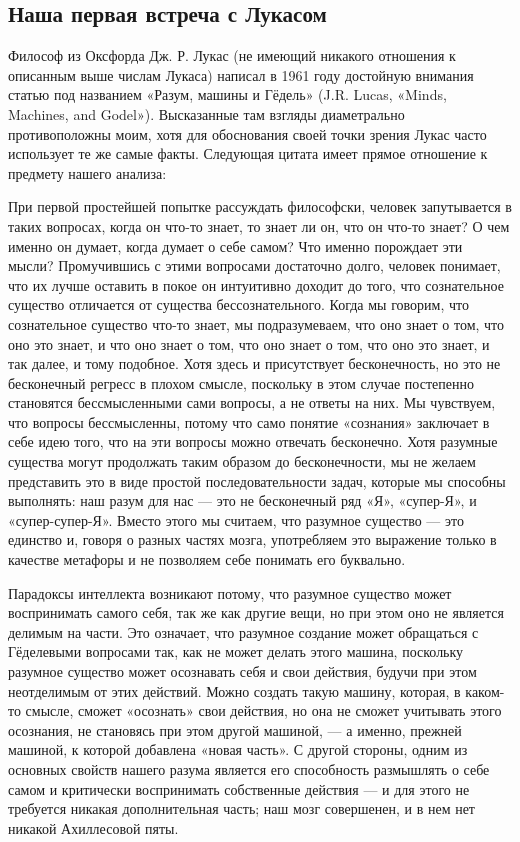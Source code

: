\documentclass[../main.tex]{subfiles}
\begin{document}
\subsection{Наша первая встреча с Лукасом}

Философ из Оксфорда Дж. Р. Лукас (не имеющий никакого отношения к описанным выше числам Лукаса) написал в 1961 году достойную внимания статью под названием «Разум, машины и Гёдель» (J.R. Lucas, «Minds, Machines, and Godel»). Высказанные там взгляды диаметрально противоположны моим, хотя для обоснования своей точки зрения Лукас часто использует те же самые факты. Следующая цитата имеет прямое отношение к предмету нашего анализа:

При первой простейшей попытке рассуждать философски, человек запутывается в таких вопросах, когда он что-то знает, то знает ли он, что он что-то знает? О чем именно он думает, когда думает о себе самом? Что именно порождает эти мысли? Промучившись с этими вопросами достаточно долго, человек понимает, что их лучше оставить в покое он интуитивно доходит до того, что сознательное существо отличается от существа бессознательного. Когда мы говорим, что сознательное существо что-то знает, мы подразумеваем, что оно знает о том, что оно это знает, и что оно знает о том, что оно знает о том, что оно это знает, и так далее, и тому подобное. Хотя здесь и присутствует бесконечность, но это не бесконечный регресс в плохом смысле, поскольку в этом случае постепенно становятся бессмысленными сами вопросы, а не ответы на них. Мы чувствуем, что вопросы бессмысленны, потому что само понятие «сознания» заключает в себе идею того, что на эти вопросы можно отвечать бесконечно. Хотя разумные существа могут продолжать таким образом до бесконечности, мы не желаем представить это в виде простой последовательности задач, которые мы способны выполнять: наш разум для нас --- это не бесконечный ряд «Я», «супер-Я», и «супер-супер-Я». Вместо этого мы считаем, что разумное существо --- это единство и, говоря о разных частях мозга, употребляем это выражение только в качестве метафоры и не позволяем себе понимать его буквально.

Парадоксы интеллекта возникают потому, что разумное существо может воспринимать самого себя, так же как другие вещи, но при этом оно не является делимым на части. Это означает, что разумное создание может обращаться с Гёделевыми вопросами так, как не может делать этого машина, поскольку разумное существо может осознавать себя и свои действия, будучи при этом неотделимым от этих действий. Можно создать такую машину, которая, в каком-то смысле, сможет «осознать» свои действия, но она не сможет учитывать этого осознания, не становясь при этом другой машиной, --- а именно, прежней машиной, к которой добавлена «новая часть». С другой стороны, одним из основных свойств нашего разума является его способность размышлять о себе самом и критически воспринимать собственные действия --- и для этого не требуется никакая дополнительная часть; наш мозг совершенен, и в нем нет никакой Ахиллесовой пяты.
\end{document}

